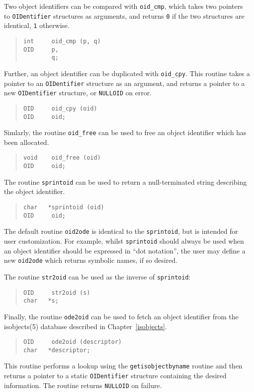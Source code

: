 Two object identifiers can be compared with \verb"oid_cmp",
which takes two pointers to \verb"OIDentifier" structures as arguments,
and returns \verb"0" if the two structures are identical,
\verb"1" otherwise.
\begin{quote}\small\begin{verbatim}
int     oid_cmp (p, q)
OID     p,
        q;
\end{verbatim}\end{quote}
Further, an object identifier can be duplicated with \verb"oid_cpy".
This routine takes a pointer to an \verb"OIDentifier" structure as an argument,
and  returns a pointer to a new \verb"OIDentifier" structure,
or \verb"NULLOID" on error.
\begin{quote}\small\begin{verbatim}
OID     oid_cpy (oid)
OID     oid;
\end{verbatim}\end{quote}
Simlarly, the routine \verb"oid_free" can be used to free an object
identifier which has been allocated.
\begin{quote}\small\begin{verbatim}
void    oid_free (oid)
OID     oid;
\end{verbatim}\end{quote}
The routine \verb"sprintoid" can be used to return a null-terminated
string describing the object identifier.
\begin{quote}\small\begin{verbatim}
char   *sprintoid (oid)
OID     oid;
\end{verbatim}\end{quote}
The default routine \verb"oid2ode" is identical to the
\verb"sprintoid",
but is intended for user customization.
For example,
whilst \verb"sprintoid" should always be used when an object identifier should
be expressed in ``dot notation'',
the user may define a new \verb"oid2ode" which returns symbolic names,
if so desired.

The routine \verb"str2oid" can be used as the inverse of \verb"sprintoid":
\begin{quote}\small\begin{verbatim}
OID     str2oid (s)
char   *s;
\end{verbatim}\end{quote}
Finally,
the routine \verb"ode2oid" can be used to fetch an object identifier from the
\man isobjects(5) database described in Chapter~\ref{isobjects}.
\begin{quote}\small\begin{verbatim}
OID     ode2oid (descriptor)
char   *descriptor;
\end{verbatim}\end{quote}
This routine performs a lookup using the \verb"getisobjectbyname" routine
and then returns a pointer to a static \verb"OIDentifier" structure
containing the desired information.
The routine returns \verb"NULLOID" on failure.

